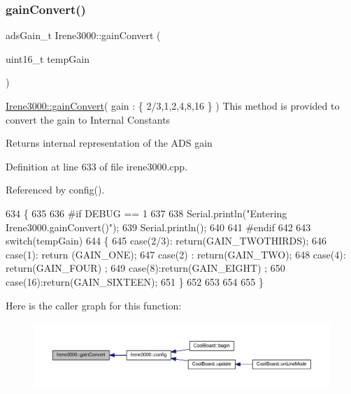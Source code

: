 \subsubsection{\texorpdfstring{gain\+Convert()}{gainConvert()}}
{\footnotesize\ttfamily ads\+Gain\+\_\+t Irene3000\+::gain\+Convert (\begin{DoxyParamCaption}\item[{uint16\+\_\+t}]{temp\+Gain }\end{DoxyParamCaption})}

\hyperlink{classIrene3000_abcad62d1201a59f8dd3ba87048002728}{Irene3000\+::gain\+Convert}( gain \+: \{ 2/3,1,2,4,8,16 \} ) This method is provided to convert the gain to Internal Constants

\begin{DoxyReturn}{Returns}
internal representation of the A\+DS gain 
\end{DoxyReturn}


Definition at line 633 of file irene3000.\+cpp.



Referenced by config().


\begin{DoxyCode}
634 \{
635 
636 \textcolor{preprocessor}{#if DEBUG == 1 }
637 
638     Serial.println(\textcolor{stringliteral}{"Entering Irene3000.gainConvert()"});
639     Serial.println();
640 
641 \textcolor{preprocessor}{#endif }
642     
643     \textcolor{keywordflow}{switch}(tempGain)
644     \{
645         \textcolor{keywordflow}{case}(2/3): \textcolor{keywordflow}{return}(GAIN\_TWOTHIRDS);
646         \textcolor{keywordflow}{case}(1): \textcolor{keywordflow}{return} (GAIN\_ONE);
647         \textcolor{keywordflow}{case}(2) : \textcolor{keywordflow}{return}(GAIN\_TWO);
648         \textcolor{keywordflow}{case}(4): \textcolor{keywordflow}{return}(GAIN\_FOUR) ;   
649         \textcolor{keywordflow}{case}(8):\textcolor{keywordflow}{return}(GAIN\_EIGHT)  ;  
650         \textcolor{keywordflow}{case}(16):\textcolor{keywordflow}{return}(GAIN\_SIXTEEN);  
651     \}
652 
653 
654 
655 \}
\end{DoxyCode}
Here is the caller graph for this function\+:\nopagebreak
\begin{figure}[H]
\begin{center}
\leavevmode
\includegraphics[width=350pt]{classIrene3000_abcad62d1201a59f8dd3ba87048002728_icgraph}
\end{center}
\end{figure}
\mbox{\label{classIrene3000_a7bc2414100b5e19eacc6630fa34b2654}} 
